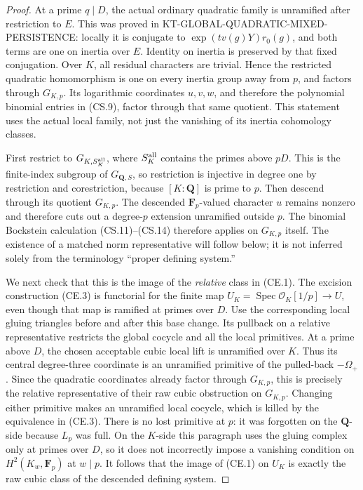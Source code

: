 \documentclass[11pt,a4paper]{article}
\theoremstyle{definition}
\begin{document}
\begin{proof}
At a prime \(q\mid D\), the actual ordinary quadratic family
is unramified after restriction to \(E\).  This was proved in
KT-GLOBAL-QUADRATIC-MIXED-PERSISTENCE: locally it is conjugate to
\(\exp(t v(g)Y)r_0(g)\), and both terms are one on inertia
over \(E\).  Identity on inertia is preserved by that fixed
conjugation.  Over \(K\), all residual characters are trivial.
Hence the restricted quadratic homomorphism is one on every
inertia group away from \(p\), and factors through \(G_{K,p}\).
Its logarithmic coordinates \(u,v,w\), and therefore the
polynomial binomial entries in (CS.9), factor through that
same quotient.  This statement uses the actual local family,
not just the vanishing of its inertia cohomology classes.

First restrict to \(G_{K,S_K^{\rm all}}\), where
\(S_K^{\rm all}\) contains the primes above \(pD\).
This is the finite-index subgroup of \(G_{\mathbf Q,S}\),
so restriction is injective in degree one by restriction
and corestriction, because \([K:\mathbf Q]\) is prime to \(p\).
Then descend through its quotient \(G_{K,p}\).
The descended \(\mathbf F_p\)-valued
character \(u\) remains nonzero and therefore cuts out
a degree-\(p\) extension unramified outside \(p\).
The binomial Bockstein calculation (CS.11)--(CS.14)
therefore applies on \(G_{K,p}\) itself.  The existence
of a matched norm representative will follow below;
it is not inferred solely from the terminology
``proper defining system.''

We next check that this is the image of the \emph{relative}
class in (CE.1).  The excision construction (CE.3) is functorial
for the finite map
\(U_K=\operatorname{Spec}\mathcal O_K[1/p]\to U\),
even though that map is ramified at primes over \(D\).
Use the corresponding local gluing triangles before and after
this base change.  Its pullback on a relative representative
restricts the global cocycle and all the local primitives.
At a prime above \(D\), the chosen acceptable cubic local
lift is unramified over \(K\).  Thus its central degree-three
coordinate is an unramified primitive of the pulled-back
\(-\Omega_+\).  Since the quadratic coordinates already
factor through \(G_{K,p}\), this is precisely the relative
representative of their raw cubic obstruction on \(G_{K,p}\).
Changing either primitive makes an unramified local cocycle,
which is killed by the equivalence in (CE.3).
There is no lost primitive at \(p\): it was forgotten on the
\(\mathbf Q\)-side because \(L_p\) was full.  On the
\(K\)-side this paragraph uses the gluing complex only at
primes over \(D\), so it does not incorrectly impose a
vanishing condition on \(H^2(K_w,\mathbf F_p)\) at \(w\mid p\).
It follows that the image of (CE.1) on \(U_K\) is exactly
the raw cubic class of the descended defining system.


\end{proof}
\end{document}
